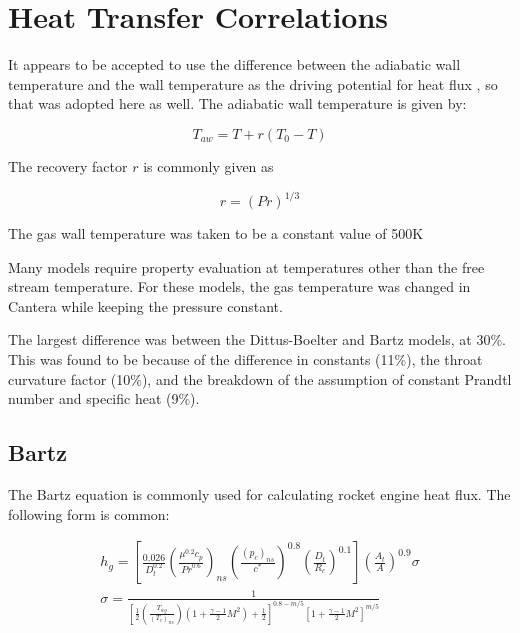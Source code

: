 \documentclass[11pt]{article}
\begin{document}
\section{Heat Transfer Correlations}

It appears to be accepted to use the difference between the adiabatic wall temperature and the wall temperature as the driving potential for heat flux \cite{}, so that was adopted here as well. The adiabatic wall temperature is given by:

\begin{equation}
    T_{aw} = T + r(T_0 - T)
\end{equation}

The recovery factor $r$ is commonly given as

\begin{equation}
    r = (Pr)^{1/3}
\end{equation}

The gas wall temperature was taken to be a constant value of 500K %

Many models require property evaluation at temperatures other than the free stream temperature. For these models, the gas temperature was changed in Cantera while keeping the pressure constant.


The largest difference was between the Dittus-Boelter and Bartz models, at 30\%. This was found to be because of the difference in constants (11\%), the throat curvature factor (10\%), and the breakdown of the assumption of constant Prandtl number and specific heat (9\%).

\subsection{Bartz}


The Bartz equation is commonly used for calculating rocket engine heat flux. The following form is common:

\begin{equation}
    \label{equation:bartz}
    \begin{split}
         h_g = \left[ \frac{0.026}{D_t^{0.2}} \left( \frac{\mu^{0.2} c_p}{{Pr}^{0.6}} \right)_{ns} \left( \frac{(p_c)_{ns}}{c^*} \right)^{0.8} \left( \frac{D_t}{R_c} \right)^{0.1} \right] \left( \frac{A_t}{A} \right)^{0.9} \sigma \\
         \sigma = \frac{1}{\left[ \frac{1}{2} \left( \frac{T_{wg}}{(T_c)_{ns}} \right) \left( 1 + \frac{\gamma - 1}{2} M^2 \right) + \frac{1}{2}\right]^{0.8-m/5} \left[ 1 + \frac{\gamma - 1}{2} M^2 \right]^{m/5}}
    \end{split}
\end{equation}
\end{document}
